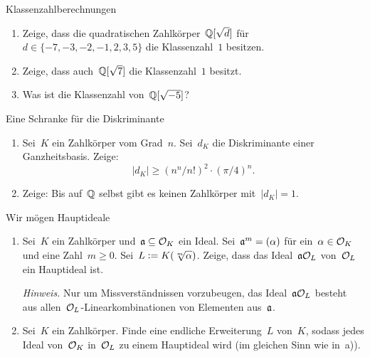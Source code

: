 \documentclass{uebblatt}
\begin{document}

\begin{aufgabe}{Klassenzahlberechnungen}
\begin{enumerate}
\item Zeige, dass die quadratischen Zahlkörper~$\mathbb{Q}[\sqrt{d}]$ für~$d \in \{
-7, -3, -2, -1, 2, 3, 5 \}$ die Klassenzahl~$1$ besitzen.
\item Zeige, dass auch~$\mathbb{Q}[\sqrt{7}]$ die Klassenzahl~$1$ besitzt.
\item Was ist die Klassenzahl von~$\mathbb{Q}[\sqrt{-5}]$?
\end{enumerate}
\end{aufgabe}

\begin{aufgabe}{Eine Schranke für die Diskriminante}
\begin{enumerate}
\item Sei~$K$ ein Zahlkörper vom Grad~$n$. Sei~$d_K$ die Diskriminante einer
Ganzheitsbasis. Zeige:
\[ |d_K| \geq (n^n / n!)^2 \cdot (\pi/4)^n. \]
\item Zeige: Bis auf~$\mathbb{Q}$ selbst gibt es keinen Zahlkörper mit~$|d_K| = 1$.
\end{enumerate}
\end{aufgabe}

\begin{aufgabe}{Wir mögen Hauptideale}
\begin{enumerate}
\item Sei~$K$ ein Zahlkörper und~$\mathfrak{a} \subseteq \mathcal{O}_K$ ein Ideal. Sei~$\mathfrak{a}^m =
(\alpha)$ für ein~$\alpha \in \mathcal{O}_K$ und eine Zahl~$m \geq 0$. Sei~$L \vcentcolon=
K(\sqrt[m]{\alpha})$. Zeige, dass das Ideal~$\mathfrak{a} \mathcal{O}_L$ von~$\mathcal{O}_L$ ein
Hauptideal ist.

{\tiny\emph{Hinweis.} Nur um Missverständnissen vorzubeugen, das
Ideal~$\mathfrak{a}\mathcal{O}_L$ besteht aus allen~$\mathcal{O}_L$-Linearkombinationen von Elementen
aus~$\mathfrak{a}$.\par}
\item Sei~$K$ ein Zahlkörper. Finde eine endliche Erweiterung~$L$ von~$K$,
sodass jedes Ideal von~$\mathcal{O}_K$ in~$\mathcal{O}_L$ zu einem Hauptideal wird (im gleichen
Sinn wie in~a)).
\end{enumerate}
\end{aufgabe}
\end{document}

